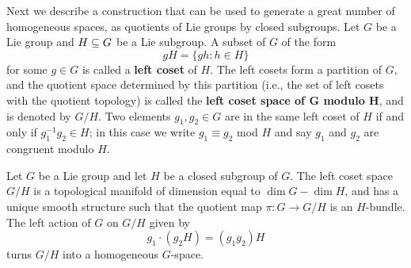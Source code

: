 Next we describe a construction that can be used to generate a great number of homogeneous spaces, as quotients of Lie groups by closed subgroups. Let $G$ be a Lie group and $H\subseteq G$ be a Lie subgroup. A subset of $G$ of the form
\[gH=\{gh:h\in H\}\]
for some $g\in G$ is called a \textbf{left coset} of $H$. The left cosets form a partition of $G$, and the quotient space determined by this partition (i.e., the set of left cosets with the quotient topology) is called the \textbf{left coset space of $\bm{G}$ modulo $\bm{H}$}, and is denoted by $G/H$. Two elements $g_1,g_2\in G$ are in the same left coset of $H$ if and only if $g_1^{-1}g_2\in H$; in this case we write $g_1\equiv g_2$ mod $H$ and say $g_1$ and $g_2$ are congruent modulo $H$.

\begin{theorem}\label{homogenerous construct}
Let $G$ be a Lie group and let $H$ be a closed subgroup of $G$. The left coset space $G/H$ is a topological manifold of dimension equal to $\dim G-\dim H$, and has a unique smooth structure such that the quotient map $\pi:G\to G/H$ is an $H$-bundle. The left action of $G$ on $G/H$ given by
\[g_1\cdot(g_2H)=(g_1g_2)H\]
turns $G/H$ into a homogeneous $G$-space.
\end{theorem}
